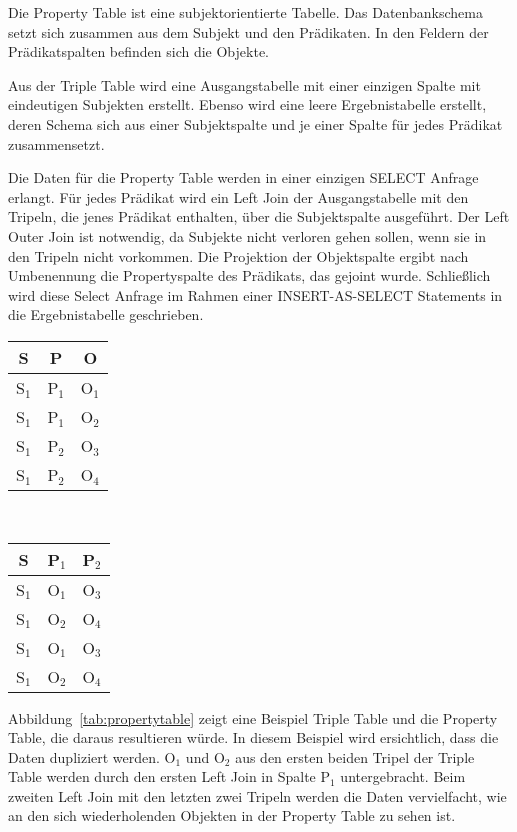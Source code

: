 \documentclass[
  a4paper,
  12pt,
  oneside,
  parskip=half,
  headsepline,
]{scrartcl}
\begin{document}
Die Property Table ist eine subjektorientierte Tabelle. Das Datenbankschema
setzt sich zusammen aus dem Subjekt und den Prädikaten. In den Feldern der
Prädikatspalten befinden sich die Objekte.

Aus der Triple Table wird eine Ausgangstabelle mit einer einzigen Spalte
mit eindeutigen Subjekten erstellt. Ebenso wird eine leere Ergebnistabelle 
erstellt, deren Schema sich aus einer Subjektspalte und je einer Spalte 
für jedes Prädikat zusammensetzt.

Die Daten für die Property Table werden in einer einzigen SELECT Anfrage
erlangt. Für jedes Prädikat wird ein Left Join der Ausgangstabelle mit den
Tripeln, die jenes Prädikat enthalten, über die Subjektspalte ausgeführt. Der
Left Outer Join ist notwendig, da Subjekte nicht verloren gehen sollen, wenn sie
in den Tripeln nicht vorkommen. Die Projektion der Objektspalte ergibt nach
Umbenennung die Propertyspalte des Prädikats, das gejoint wurde. Schließlich wird
diese Select Anfrage im Rahmen einer INSERT-AS-SELECT Statements in die
Ergebnistabelle geschrieben.

\begin{figure*}[htb]
	\centering
	\begin{tabular}{|c|c|c|}
		\hline
		S & P & O \\
		\hline
		S$_1$ & P$_1$ & O$_1$ \\
		S$_1$ & P$_1$ & O$_2$ \\
		S$_1$ & P$_2$ & O$_3$ \\
		S$_1$ & P$_2$ & O$_4$ \\
		\hline
	\end{tabular}
	~
	\begin{tabular}{|c|c|c|}
		\hline
		S & P$_1$ & P$_2$ \\
		\hline
		S$_1$ & O$_1$ & O$_3$ \\
		S$_1$ & O$_2$ & O$_4$ \\
		S$_1$ & O$_1$ & O$_3$ \\
		S$_1$ & O$_2$ & O$_4$ \\
		\hline
	\end{tabular}
	\caption{Beispiel Triple Table und zugehörige Property Table.}
	\label{tab:propertytable}
\end{figure*}

Abbildung~\ref{tab:propertytable} zeigt eine Beispiel Triple Table und die
Property Table, die daraus resultieren würde. In diesem Beispiel wird
ersichtlich, dass die Daten dupliziert werden. O$_1$ und O$_2$ aus den ersten
beiden Tripel der Triple Table werden durch den ersten Left Join in Spalte P$_1$
untergebracht. Beim zweiten Left Join mit den letzten zwei Tripeln werden die
Daten vervielfacht, wie an den sich wiederholenden Objekten in der Property Table
zu sehen ist.
\end{document}
